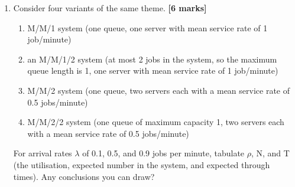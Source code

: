 \begin{enumerate}
\begin{enumerate}
\begin{center}
$\Lambda_1$ = 2 \hspace*{0.5in} 
$\Lambda_2$ = 1 \hspace*{0.5in} 
$\Lambda_3$ = 4
\end{center}

measured in customers per minute.

\item Hence find individual node utilisations   \hfill {\bf [2 marks]}\\

\item ... the expected number of customers at each node, and 
the expected number of customers in the system as a whole,
\hfill {\bf [2 marks]}\\


\item ... and average time spent by a customer in the system.  
\hfill {\bf [2 marks]}\\

\end{enumerate}

\newpage

\item Consider four variants of the same theme. \hfill {\bf [6 marks]}\\

\begin{enumerate}

\item M/M/1 system (one queue, one server with
          mean service rate of 1 job/minute)

\item an M/M/1/2 system (at most 2 jobs in the system,
so the maximum queue length is 1,
one server with mean service rate of 1 job/minute)

\item M/M/2 system (one queue, two servers each with a
          mean service rate of 0.5 jobs/minute)

\item M/M/2/2 system (one queue of maximum capacity 1, 
    two servers each with a mean service rate of 0.5 jobs/minute)

\end{enumerate}

For arrival rates $\lambda$ of 0.1, 0.5, and 0.9 jobs per minute,
tabulate $\rho$, N, and T (the utilisation, 
expected number in the system, and
expected through times).
Any conclusions you can draw?



\end{enumerate}

